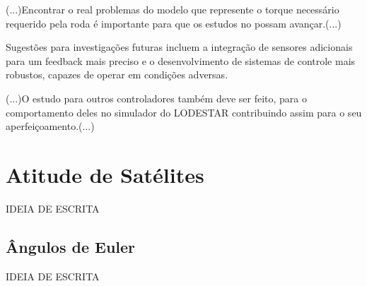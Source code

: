 \documentclass[
	12pt,				%
	openright,			%
	oneside,			%
	a4paper,			%
	english,			%
	brazil				%
	]{abntex2}
\begin{document}
\begin{citacao}
	(...)Encontrar o real problemas do modelo que represente o torque necessário requerido pela roda é importante para que os estudos no possam avançar.(...)
\end{citacao}


 Sugestões para investigações futuras incluem a integração de sensores adicionais para um feedback mais preciso e o desenvolvimento de sistemas de controle mais robustos, capazes de operar em condições adversas.

\begin{citacao}
	(...)O estudo para outros controladores também deve ser feito, para o comportamento
	deles no simulador do LODESTAR contribuindo assim para o seu aperfeiçoamento.(...)
\end{citacao}




 

\chapter{Atitude de Satélites}\label{cap:atitude}

IDEIA DE ESCRITA

\section{Ângulos de Euler}


IDEIA DE ESCRITA
\end{document}
